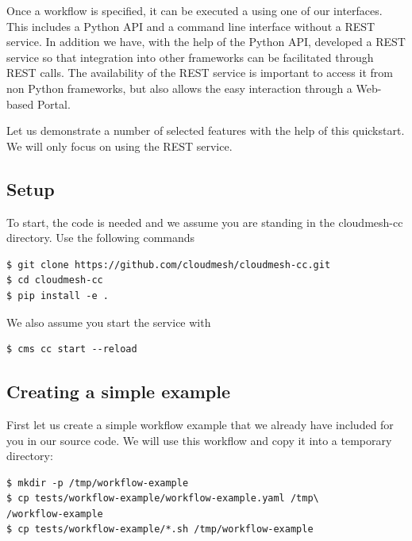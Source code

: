 Once a workflow is specified, it can be executed a using one of our
interfaces. This includes a Python API and a command line interface
without a REST service. In addition we have, with the help of the Python
API, developed a REST service so that integration into other frameworks
can be facilitated through REST calls. The availability of the REST
service is important to access it from non Python frameworks, but also
allows the easy interaction through a Web-based Portal.

Let us demonstrate a number of selected features with the help of this
quickstart. We will only focus on using the REST service.

\subsection{Setup}\label{setup}

To start, the code is needed and we assume you are standing in the
cloudmesh-cc directory. Use the following commands

\smallskip
\begin{verbatim}
$ git clone https://github.com/cloudmesh/cloudmesh-cc.git
$ cd cloudmesh-cc
$ pip install -e .
\end{verbatim}
\smallskip

We also assume you start the service with

\smallskip
\begin{verbatim}
$ cms cc start --reload
\end{verbatim}
\smallskip

\subsection{Creating a simple example}\label{creating-a-simple-example}

First let us create a simple workflow example that we already have
included for you in our source code. We will use this workflow and copy
it into a temporary directory:

\smallskip
\begin{verbatim}
$ mkdir -p /tmp/workflow-example
$ cp tests/workflow-example/workflow-example.yaml /tmp\
/workflow-example
$ cp tests/workflow-example/*.sh /tmp/workflow-example
\end{verbatim}
\smallskip


